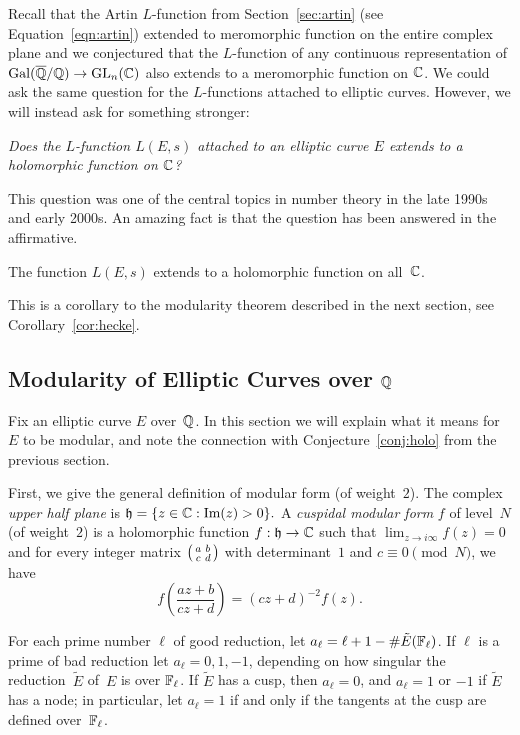 Recall that the Artin $L$-function from Section~\ref{sec:artin}
(see Equation~\ref{eqn:artin}) extended to meromorphic function
on the entire complex plane and we conjectured that the $L$-function
of any continuous representation of $\operatorname{Gal}(\overline{\mathbb{Q}}/\mathbb{Q}) \to \operatorname{GL}_n(\mathbb{C})$ also
extends to a meromorphic function on $\mathbb{C}$. We could ask the same
question for the $L$-functions attached to elliptic curves. However,
we will instead ask for something stronger:
\begin{center}
\emph{Does the $L$-function $L(E,s)$ attached to an
elliptic curve $E$ extends to a holomorphic function on $\mathbb{C}$?}
\end{center}
This question was one of the central topics
in number theory in the late 1990s and early 2000s.
An amazing fact is that the question has been answered
in the affirmative.
\begin{theorem}\label{conj:holo}
The function $L(E,s)$ extends to a holomorphic
function on all~$\mathbb{C}$.
\end{theorem}
This is a corollary to the modularity theorem described
in the next section, see Corollary~\ref{cor:hecke}.


\subsection{Modularity of Elliptic Curves over $\mathbb{Q}$}
Fix an elliptic curve $E$ over~$\mathbb{Q}$.  In this section we will explain
what it means for $E$ to be modular, and note the connection with
Conjecture~\ref{conj:holo} from the previous section.

First, we give the general definition of modular form (of weight~$2$).
The complex {\em upper half plane} is
$
  \mathfrak{h}  = \{z  \in \mathbb{C} : \text{Im}(z) > 0\}.
$
A {\em cuspidal modular form} $f$ of level~$N$ (of weight~$2$) is a holomorphic
function
$
   f : \mathfrak{h} \to \mathbb{C}
$
such that $\lim_{z\to i\infty} f(z) = 0$ and for every integer matrix
$\left( \begin{smallmatrix}a&b\\c&d\end{smallmatrix}\right)$ with determinant~$1$ and $c\equiv 0 \pmod{N}$, we have
$$
  f\left( \frac{az + b}{cz + d} \right)
         = (cz+d)^{-2} f(z).
$$

For each prime number $\ell$ of good reduction, let $a_\ell = \ell+1 -
\#\tilde{E}(\mathbb{F}_{\ell})$.  If $\ell$ is a prime of bad reduction let
$a_\ell = 0,1,-1$, depending on how singular the reduction~$\tilde{E}$
of~$E$ is over $\mathbb{F}_{\ell}$.  If $\tilde{E}$ has a cusp, then $a_\ell=0$,
and $a_\ell=1$ or $-1$ if $\tilde{E}$ has a node; in particular,
let $a_\ell=1$ if
and only if the tangents at the cusp are defined over~$\mathbb{F}_{\ell}$.

